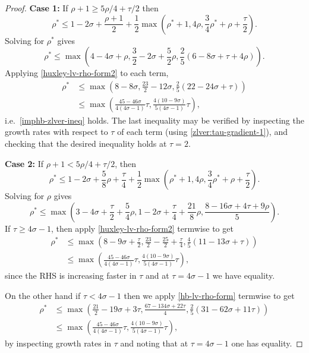 \begin{proof}
\textbf{Case 1:} If $\rho + 1 \ge 5\rho/4 + \tau/2$ then
\[
\rho^* \le 1 -2\sigma + \frac{\rho + 1}{2} + \frac{1}{2}\max\left(\rho^* + 1, 4\rho, \frac{3}{4}\rho^*+\rho +\frac{\tau}{2}\right).
\]
Solving for $\rho^*$ gives
\[
\rho^* \le \max\left(4 - 4\sigma + \rho, \frac{3}{2} - 2\sigma + \frac{5}{2}\rho, \frac{2}{5}(6 - 8\sigma + \tau + 4\rho)\right).
\]
Applying \eqref{huxley-lv-rho-form2} to each term,
\begin{align*}
\rho^* &\le \max\left(8 - 8\sigma, \frac{23}{2} - 12\sigma, \frac{2}{5}(22 - 24\sigma + \tau)\right) \\
&\le \max\left(\frac{45 - 46\sigma}{4(4\sigma - 1)}\tau, \frac{4(10 - 9\sigma)}{5(4\sigma - 1)}\tau\right),
\end{align*}
i.e.\ \eqref{imphb-zlver-ineq} holds. The last inequality may be verified by inspecting the growth rates with respect to $\tau$ of each term (using \eqref{zlver:tau-gradient-1}), and checking that the desired inequality holds at $\tau = 2$.

\textbf{Case 2:} If $\rho + 1 < 5\rho/4 + \tau/2$, then
\[
\rho^* \le 1 - 2\sigma + \frac{5}{8}\rho + \frac{\tau}{4} + \frac{1}{2}\max\left(\rho^* + 1, 4\rho, \frac{3}{4}\rho^*+\rho +\frac{\tau}{2}\right).
\]
Solving for $\rho$ gives
\[
\rho^* \le \max\left(3 - 4\sigma + \frac{\tau}{2} + \frac{5}{4}\rho, 1 - 2\sigma + \frac{\tau}{4} + \frac{21}{8}\rho, \frac{8 - 16\sigma + 4\tau + 9\rho}{5}\right).
\]
If $\tau \ge 4\sigma - 1$, then apply \eqref{huxley-lv-rho-form2} termwise to get
\begin{align*}
\rho^* &\le \max\left(8 - 9\sigma + \frac{\tau}{2}, \frac{23}{2} - \frac{25}{2} + \frac{\tau}{4}, \frac{4}{5}(11 - 13 \sigma + \tau)\right)\\
&\le \max\left(\frac{45 - 46\sigma}{4(4\sigma - 1)}\tau, \frac{4(10 - 9\sigma)}{5(4\sigma - 1)}\tau\right),
\end{align*}
since the RHS is increasing faster in $\tau$ and at $\tau = 4\sigma - 1$ we have equality.

On the other hand if $\tau < 4\sigma - 1$ then we apply \eqref{hb-lv-rho-form} termwise to get
\begin{align*}
    \rho^* &\le \max\left(\frac{21}{2} - 19\sigma + 3\tau, \frac{67 -134\sigma + 22\tau}{4}, \frac{2}{5}(31 - 62\sigma + 11\tau)\right)\\
    &\le \max\left(\frac{45 - 46\sigma}{4(4\sigma - 1)}\tau, \frac{4(10 - 9\sigma)}{5(4\sigma - 1)}\tau\right),
\end{align*}
by inspecting growth rates in $\tau$ and noting that at $\tau = 4\sigma - 1$ one has equality.


\end{proof}
